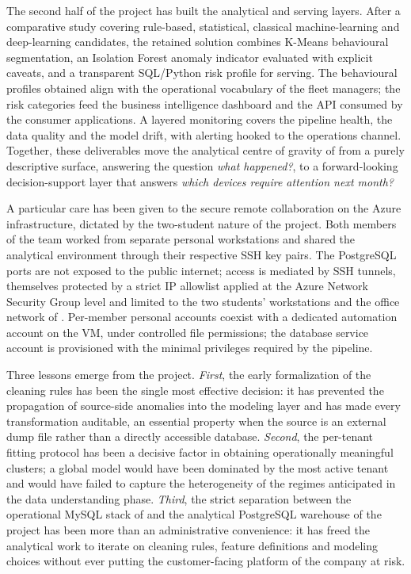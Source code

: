 The second half of the project has built the analytical and serving layers. After a comparative study covering rule-based, statistical, classical machine-learning and deep-learning candidates, the retained solution combines K-Means behavioural segmentation, an Isolation Forest anomaly indicator evaluated with explicit caveats, and a transparent SQL/Python risk profile for serving. The behavioural profiles obtained align with the operational vocabulary of the fleet managers; the risk categories feed the business intelligence dashboard and the API consumed by the consumer applications. A layered monitoring covers the pipeline health, the data quality and the model drift, with alerting hooked to the operations channel. Together, these deliverables move the analytical centre of gravity of \hostorg{} from a purely descriptive surface, answering the question \emph{what happened?}, to a forward-looking decision-support layer that answers \emph{which devices require attention next month?}

A particular care has been given to the secure remote collaboration on the Azure infrastructure, dictated by the two-student nature of the project. Both members of the team worked from separate personal workstations and shared the analytical environment through their respective SSH key pairs. The PostgreSQL ports are not exposed to the public internet; access is mediated by SSH tunnels, themselves protected by a strict IP allowlist applied at the Azure Network Security Group level and limited to the two students' workstations and the office network of \hostorg. Per-member personal accounts coexist with a dedicated automation account on the VM, under controlled file permissions; the database service account is provisioned with the minimal privileges required by the pipeline.

Three lessons emerge from the project. \emph{First}, the early formalization of the cleaning rules has been the single most effective decision: it has prevented the propagation of source-side anomalies into the modeling layer and has made every transformation auditable, an essential property when the source is an external dump file rather than a directly accessible database. \emph{Second}, the per-tenant fitting protocol has been a decisive factor in obtaining operationally meaningful clusters; a global model would have been dominated by the most active tenant and would have failed to capture the heterogeneity of the regimes anticipated in the data understanding phase. \emph{Third}, the strict separation between the operational MySQL stack of \hostorg{} and the analytical PostgreSQL warehouse of the project has been more than an administrative convenience: it has freed the analytical work to iterate on cleaning rules, feature definitions and modeling choices without ever putting the customer-facing platform of the company at risk.

